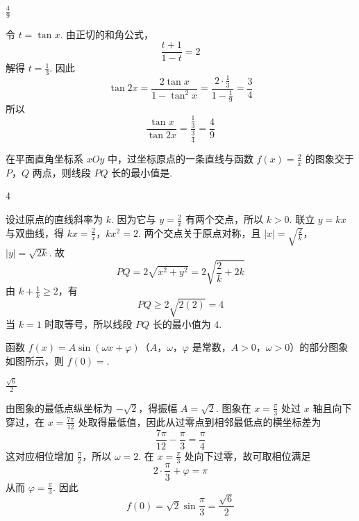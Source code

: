 \begin{answer}
\(\frac{4}{9}\)
\end{answer}

\begin{solution}
令 \(t=\tan x\). 由正切的和角公式，
\[
\frac{t+1}{1-t}=2
\]
解得 \(t=\frac{1}{3}\). 因此
\[
\tan 2x=\frac{2\tan x}{1-\tan^2x}
=\frac{2\cdot\frac13}{1-\frac19}=\frac34
\]
所以
\[
\frac{\tan x}{\tan2x}=\frac{\frac13}{\frac34}=\frac49
\]
\end{solution}

\begin{problem}
在平面直角坐标系 \(xOy\) 中，过坐标原点的一条直线与函数 \(f(x)=\frac{2}{x}\) 的图象交于 \(P\)，\(Q\) 两点，则线段 \(PQ\) 长的最小值是\fillinblank{}.
\end{problem}

\begin{answer}
4
\end{answer}

\begin{solution}
设过原点的直线斜率为 \(k\). 因为它与 \(y=\frac{2}{x}\) 有两个交点，所以 \(k>0\). 联立 \(y=kx\) 与双曲线，得
\(kx=\frac{2}{x}\)，\(kx^2=2\).
两个交点关于原点对称，且
\(|x|=\sqrt{\frac{2}{k}}\)，\(|y|=\sqrt{2k}\).
故
\[
PQ=2\sqrt{x^2+y^2}=2\sqrt{\frac{2}{k}+2k}
\]
由 \(k+\frac{1}{k}\geqslant2\)，有
\[
PQ\geqslant2\sqrt{2\left(2\right)}=4
\]
当 \(k=1\) 时取等号，所以线段 \(PQ\) 长的最小值为 \(4\).
\end{solution}

\begin{problem}
函数 \(f(x)=A\sin(\omega x+\varphi)\)（\(A\)，\(\omega\)，\(\varphi\) 是常数，\(A>0\)，\(\omega>0\)）的部分图象如图所示，则 \(f(0)=\)\fillinblank{}.

\end{problem}

\begin{answer}
\(\frac{\sqrt{6}}{2}\)
\end{answer}

\begin{solution}
由图象的最低点纵坐标为 \(-\sqrt{2}\)，得振幅 \(A=\sqrt{2}\). 图象在 \(x=\frac{\pi}{3}\) 处过 \(x\) 轴且向下穿过，在 \(x=\frac{7\pi}{12}\) 处取得最低值，因此从过零点到相邻最低点的横坐标差为
\[
\frac{7\pi}{12}-\frac{\pi}{3}=\frac{\pi}{4}
\]
这对应相位增加 \(\frac{\pi}{2}\)，所以 \(\omega=2\). 在 \(x=\frac{\pi}{3}\) 处向下过零，故可取相位满足
\[
2\cdot\frac{\pi}{3}+\varphi=\pi
\]
从而 \(\varphi=\frac{\pi}{3}\). 因此
\[
f(0)=\sqrt{2}\sin\frac{\pi}{3}=\frac{\sqrt{6}}{2}
\]
\end{solution}

